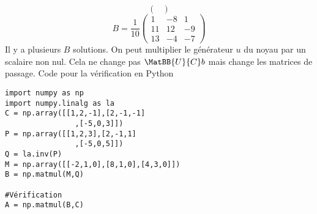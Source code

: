 \begin{enumerate}
\begin{displaymath}
\begin{pmatrix}
\end{pmatrix}
\end{displaymath}
\begin{displaymath}
B =\frac{1}{10}
\begin{pmatrix}
 1 & -8 & 1 \\ 11 & 12 & -9 \\ 13 & -4 & -7
\end{pmatrix}
\end{displaymath}
Il y a plusieurs $B$ solutions. On peut multiplier le générateur $u$ du noyau par un scalaire non nul. Cela ne change pas $\MatBB{U}{C}b$ mais change les matrices de passage.\newline
Code pour la vérification en Python
\begin{verbatim}
import numpy as np
import numpy.linalg as la
C = np.array([[1,2,-1],[2,-1,-1]
                ,[-5,0,3]])
P = np.array([[1,2,3],[2,-1,1]
                ,[-5,0,5]])
Q = la.inv(P)
M = np.array([[-2,1,0],[8,1,0],[4,3,0]])
B = np.matmul(M,Q)

#Vérification
A = np.matmul(B,C)
\end{verbatim} 
\end{enumerate}
 
